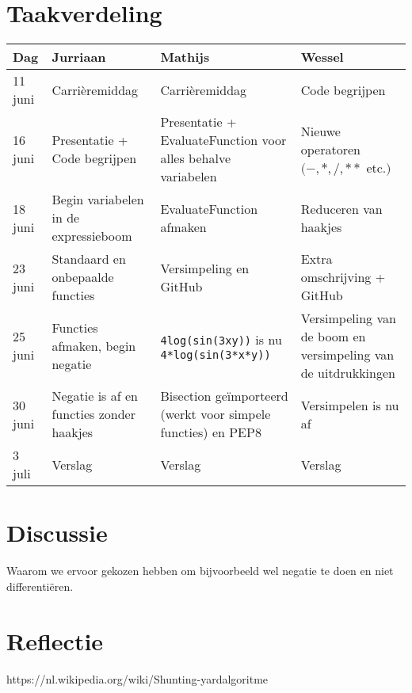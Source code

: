 \documentclass[12pt]{article}
\begin{document}
\newpage
\section{Taakverdeling}

\begin{center}
    \begin{tabular}{ | l | p{4cm}  | p{4cm} | p{4cm} |}
    \hline
    Dag & Jurriaan & Mathijs & Wessel \\ \hline
    11 juni & Carri\`eremiddag & Carri\`eremiddag & Code begrijpen \\ \hline
    16 juni & Presentatie + Code begrijpen & Presentatie + EvaluateFunction voor alles behalve variabelen & Nieuwe operatoren  $(-, *, /, **$ etc.$)$ \\ \hline
    18 juni & Begin variabelen in de expressieboom & EvaluateFunction afmaken & Reduceren van haakjes \\ \hline
    23 juni & Standaard en onbepaalde functies & Versimpeling en GitHub & Extra omschrijving + GitHub \\ \hline
    25 juni & Functies afmaken, begin negatie & \texttt{4log(sin(3xy))} is nu \texttt{4*log(sin(3*x*y))} & Versimpeling van de boom en versimpeling van de uitdrukkingen \\ \hline
    30 juni & Negatie is af en functies zonder haakjes & Bisection ge\"{i}mporteerd (werkt voor simpele functies) en PEP8 & Versimpelen is nu af \\ \hline
    3 juli & Verslag & Verslag & Verslag \\
    \hline
    \end{tabular}
\end{center}

\section{Discussie}
Waarom we ervoor gekozen hebben om bijvoorbeeld wel negatie te doen en niet differenti\"eren.


\section{Reflectie}

\begin{thebibliography}{9}
https://nl.wikipedia.org/wiki/Shunting-yardalgoritme
\end{thebibliography}
\end{document}
